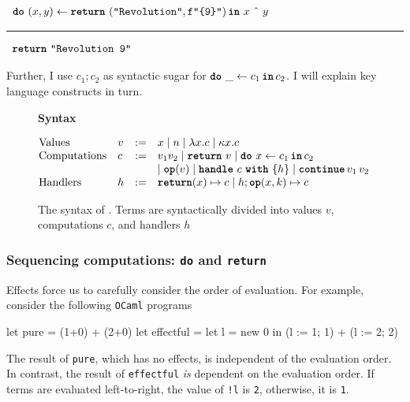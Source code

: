 \begin{eff}
$\begin{array}{l}\bind{(x, y)}{\return{(\texttt{"Revolution"}, \texttt{f"\{9\}"})}}{\, x \text{ \^\ } y}\end{array}$
\vspace{2mm} 
\textcolor{effComment}{\hrule height 0.2mm \relax}
\vspace{2mm} 

\textcolor{effComment}{$\begin{array}{l}\texttt{\textbf{return}} \,\, {\texttt{"Revolution 9"}}\end{array}$}
\end{eff}
Further, I use $c_1;c_2$ as syntactic sugar for $\texttt{\textbf{do}} \,\, {\_} \leftarrow {c_1} \, \textbf{\texttt{in}} \, {c_2}$. 
I will explain key language constructs in turn.
\begin{figure}[t]
  \begin{eff-desc}
    {\large{\textbf{Syntax}}}

  $\begin{array}{@{}llll}
  \text{Values} & v & := & x \mid n \mid \lambda x. c \mid \kappa x.c\\

  \text{Computations} & c & := & v_1 v_2 \mid \return{v} \mid \bind{x}{c_1}{c_2} \\
                             &&& \mid \op{v} \mid \handleWith{c}{h} \mid \continue{v_1}{v_2} \\ 
  \text{Handlers} & h & := &\returnHandler{x}{c} \mid h;\opHandler{x}{k}{c}
  \end{array}$
  
  \end{eff-desc}
  \caption{The syntax of \efflang. Terms are syntactically divided into values $v$, computations $c$, and handlers $h$ }
  \label{fig:eff-lang-syntax}
\end{figure}

\subsubsection{Sequencing computations: \texttt{do} and \texttt{return}}
Effects force us to carefully consider the order of evaluation. For example, consider the following \texttt{OCaml} programs
\begin{ocaml}
let pure      = (1+0) + (2+0)
let effectful = let l = new 0 in (l := 1; 1) + (l := 2; 2)
\end{ocaml}
The result of \texttt{pure}, which has no effects, is independent of the evaluation order. In contrast, the result of \texttt{effectful} \textit{is} dependent on the evaluation order. If terms are evaluated left-to-right, the value of \texttt{!l} is \texttt{2}, otherwise, it is \texttt{1}.

